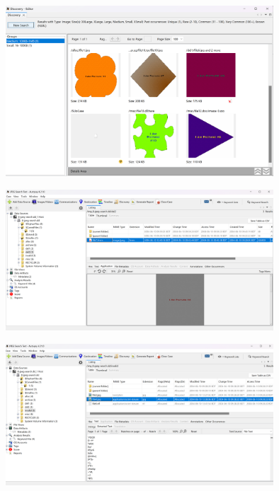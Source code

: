 \documentclass{extarticle}
\begin{document}
\begin{center}
    \includegraphics[width=0.75\textwidth]{6/6.4/All JPEG Images Found by Autopsy.png}
\end{center}

\begin{center}
    \includegraphics[width=0.75\textwidth]{6/6.4/Detecting Images with Corrupted Extension.png}
\end{center}

\begin{center}
    \includegraphics[width=0.75\textwidth]{6/6.4/Detecting Other File Types with JPEG Extension.png}
\end{center}
\end{document}
